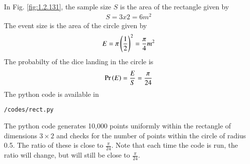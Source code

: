 In Fig. \ref{fig:1.2.131}, the sample size $S$ is the area of the rectangle given by 
\begin{align}
S=3x2=6 m^2
\end{align}
The event size is the area of the circle given by 
\begin{align}
E = \pi\left(\frac{1}{2}\right)^2=\frac{\pi}{4} m^2 
\end{align}
The probabilty of the dice landing in the circle is
\begin{align}
\Pr\left(E\right) = \frac{E}{S} = \frac{\pi}{24}
\label{eq:1.2.131_prob}
\end{align}
%
The python code is available in 
\begin{lstlisting}
/codes/rect.py
\end{lstlisting}
The python code generates 10,000 points uniformly within the rectangle of dimensions $3 \times 2$ and checks for the number of points within the circle of radius 0.5.  The ratio of these is close to $\frac{\pi}{24}$.  Note that each time the code is run, the ratio will change, but will still be close to $\frac{\pi}{24}$.
